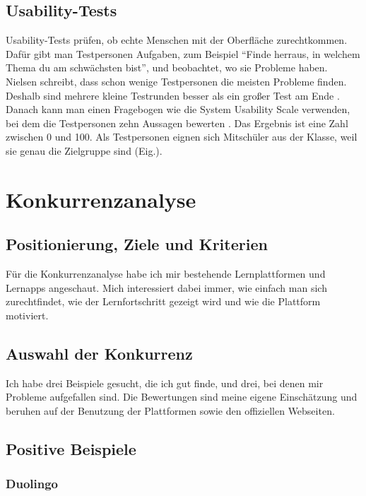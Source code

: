\subsection{Usability-Tests}
 
Usability-Tests prüfen, ob echte Menschen mit der Oberfläche zurechtkommen. Dafür gibt man Testpersonen Aufgaben, zum Beispiel \enquote{Finde herraus, in welchem Thema du am schwächsten bist}, und beobachtet, wo sie Probleme haben. Nielsen schreibt, dass schon wenige Testpersonen die meisten Probleme finden. Deshalb sind mehrere kleine Testrunden besser als ein großer Test am Ende \parencite{nielsen2000}. Danach kann man einen Fragebogen wie die System Usability Scale verwenden, bei dem die Testpersonen zehn Aussagen bewerten \parencite{brooke1996}. Das Ergebnis ist eine Zahl zwischen 0 und 100. Als Testpersonen eignen sich Mitschüler aus der Klasse, weil sie genau die Zielgruppe sind (Eig.).
 
\section{Konkurrenzanalyse}
\label{sec:konkurrenz-frontend}
 
\subsection{Positionierung, Ziele und Kriterien}
 
Für die Konkurrenzanalyse habe ich mir bestehende Lernplattformen und Lernapps angeschaut. Mich interessiert dabei immer, wie einfach man sich zurechtfindet, wie der Lernfortschritt gezeigt wird und wie die Plattform motiviert.
 
\subsection{Auswahl der Konkurrenz}
 
Ich habe drei Beispiele gesucht, die ich gut finde, und drei, bei denen mir Probleme aufgefallen sind. Die Bewertungen sind meine eigene Einschätzung und beruhen auf der Benutzung der Plattformen sowie den offiziellen Webseiten.
 
 
\subsection{Positive Beispiele}
 
\subsubsection{Duolingo}
 
